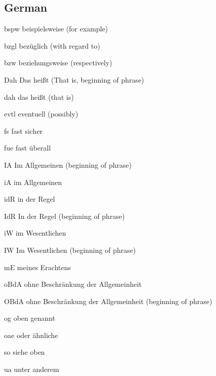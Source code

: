 \documentclass[english,a4paper,DIV=12,parskip=full,oneside]{scrartcl}
\begin{document}
        \subsection{German}
            \begin{commandlist}
                \item[bspw] beispielsweise (for example) \codeExample{\bspw}
                \item[bzgl] bezüglich (with regard to) \codeExample{\bzgl}
                \item[bzw] beziehungsweise (respectively) \codeExample{\bzw}
                \item[Dah] Das heißt (That is, beginning of phrase) \codeExample{\Dah}
                \item[dah] das heißt (that is) \codeExample{\dah}
                \item[evtl] eventuell (possibly) \codeExample{\evtl}
                \item[fs] fast sicher \codeExample{\fs}
                \item[fue] fast überall \codeExample{\fue}
                \item[IA] Im Allgemeinen (beginning of phrase) \codeExample{\IA}
                \item[iA] im Allgemeinen \codeExample{\iA}
                \item[idR] in der Regel \codeExample{\idR}
                \item[IdR] In der Regel (beginning of phrase) \codeExample{\IdR}
                \item[iW] im Wesentlichen \codeExample{\iW}
                \item[IW] Im Wesentlichen (beginning of phrase) \codeExample{\IW}
                \item[mE] meines Erachtens \codeExample{\mE}
                \item[oBdA] ohne Beschränkung der Allgemeinheit \codeExample{\oBdA}
                \item[OBdA] ohne Beschränkung der Allgemeinheit (beginning of phrase) \par\codeExample{\OBdA}
                \item[og] oben genannt \codeExample{\og}
                \item[oae] oder ähnliche \codeExample{\oae}
                \item[so] siehe oben \codeExample{\so}
                \item[ua] unter anderem \codeExample{\ua}

\end{commandlist}
\end{document}
